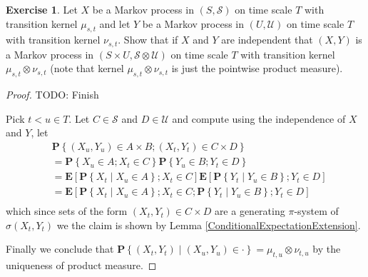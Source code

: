 \documentclass{amsbook}
\theoremstyle{definition}
\newtheorem{xca}{Exercise}
\theoremstyle{remark}
\newcommand{\expectation}[1]{\textbf{E}\left[#1\right]}
\newcommand{\probability}[1]{\textbf{P}\left \{#1 \right \}}
\newcommand{\cprobability}[2]{\textbf{P} \left \{#2 \mid #1 \right \}}
\begin{document}
\begin{xca}\label{ProductOfIndependentMarkov}Let $X$ be a Markov process in $(S, \mathcal{S})$  on time scale $T$ with
  transition kernel $\mu_{s,t}$ and
  let $Y$ be a Markov process in $(U, \mathcal{U})$ on time scale $T$ with 
  transition kernel $\nu_{s,t}$.  Show that if $X$ and $Y$ are
  independent
  that $(X,Y)$ is a Markov process in $(S \times U, \mathcal{S}
  \otimes \mathcal{U})$ on time scale $T$ with transition kernel $\mu_{s,t}
  \otimes \nu_{s,t}$ (note that kernel $\mu_{s,t}
  \otimes \nu_{s,t}$ is just the pointwise product measure).
\end{xca}
\begin{proof}
TODO: Finish

Pick $t < u \in T$.  Let $C \in \mathcal{S}$ and $D \in \mathcal{U}$ and compute using the
independence of $X$ and $Y$, let
\begin{align*}
&\probability{(X_u,Y_u) \in A \times B ; (X_t, Y_t) \in C
  \times D} \\
&=\probability{X_u \in A ; X_t \in C} \probability{Y_u \in B ; Y_t \in  D} \\
&=\expectation{\cprobability{X_u \in A}{X_t} ; X_t \in C}
\expectation{\cprobability{Y_u \in B}{Y_t} ;  Y_t \in  D} \\
&=\expectation{\cprobability{X_u \in A}{X_t} ; X_t \in C;
\cprobability{Y_u \in B}{Y_t} ;  Y_t \in  D} \\
\end{align*}
which since sets of the form $ (X_t, Y_t) \in C
  \times D$ are a generating
$\pi$-system of $\sigma(X_t,Y_t)$ we the claim is shown by Lemma
\ref{ConditionalExpectationExtension}.

Finally we conclude that $\cprobability{(X_u, Y_u) \in
  \cdot}{(X_t,Y_t)} = \mu_{t,u} \otimes \nu_{t,u}$ 
by the uniqueness of product measure.
\end{proof}
\end{document}
